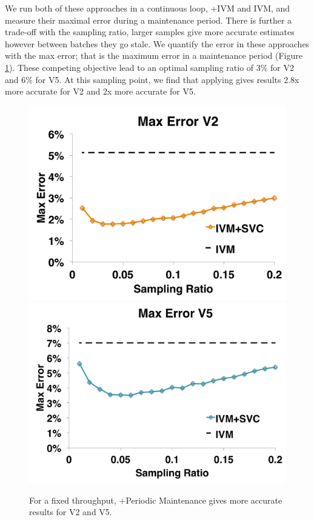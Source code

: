 We run both of these approaches in a continuous loop, \svcnospace+IVM and IVM, and measure their maximal error during a maintenance period.
There is further a trade-off with the sampling ratio, larger samples give more accurate estimates however between \svc batches they go stale.
We quantify the error in these approaches with the max error; that is the maximum error in a maintenance period (Figure \ref{conv-4}).
These competing objective lead to an optimal sampling ratio of 3\% for V2 and 6\% for V5.
At this sampling point, we find that applying \svc gives results 2.8x more accurate for V2 and 2x more accurate for V5.

\begin{figure}[t]\vspace{-2em}
\centering
 \includegraphics[scale=0.12]{exp/con_5.pdf}
 \includegraphics[scale=0.12]{exp/con_6.pdf}\vspace{-0.5em}
 \caption{For a fixed throughput, \svcnospace+Periodic Maintenance gives more accurate results for V2 and V5. \label{conv-4}} 
\end{figure}

